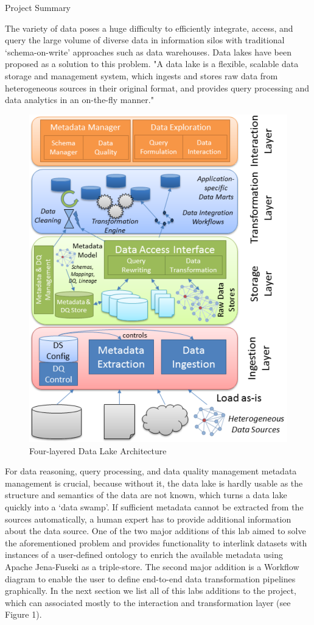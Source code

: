 \documentclass[12pt]{beamer}
\begin{document}
\begin{textblock}{0.5}
\begin{block}{Project Summary}
			\item The variety of data poses a huge difficulty to efficiently integrate, access, and query the large volume of diverse data in information silos with traditional ‘schema-on-write’ approaches such as data warehouses. Data lakes have been proposed as a solution to this problem. "A data lake is a flexible, scalable data storage and management system, which ingests and stores raw data from heterogeneous sources in their original format, and provides query processing and data analytics in an on-the-fly manner." \cite{1}
			\begin{figure}[H]
				\includegraphics[width=0.73\linewidth]{data_lake_architecture.PNG}
				\caption{Four-layered Data Lake Architecture \cite{2}} \label{Figure 1}
			\end{figure}
			For data reasoning, query processing, and data quality management metadata management is crucial, because without it, the data lake is hardly usable as the structure and semantics of the data are not known, which turns a data lake quickly into a ‘data swamp’. If sufficient metadata cannot be extracted from the sources automatically, a human expert has to provide additional information about the data source. \cite{1} One of the two major additions of this lab aimed to solve the aforementioned problem and provides functionality to interlink datasets with instances of a user-defined ontology to enrich the available metadata using Apache Jena-Fuseki as a triple-store. The second major addition is a Workflow diagram to enable the user to define end-to-end data transformation pipelines graphically. In the next section we list all of this labs additions to the project, which can associated mostly to the interaction and transformation layer (see Figure 1).
		\end{block}
		

\end{textblock}
\end{document}
